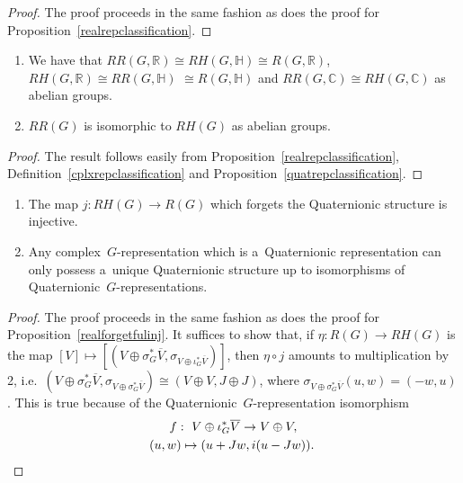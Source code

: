 \begin{proof}
The proof proceeds in the same fashion as does the proof for Proposition~\ref{realrepclassification}.
\end{proof}
\begin{Corollary}\label{3by3table}\quad
\begin{enumerate}\itemsep=0pt
\item[$1.$]
We have that $RR(G, \mathbb{R})\cong RH(G, \mathbb{H})\cong R(G, \mathbb{R})$, $RH(G, \mathbb{R})\cong RR(G,\mathbb{H})$
$\cong R(G, \mathbb{H})$ and $RR(G, \mathbb{C})\cong RH(G, \mathbb{C})$ as abelian groups.
\item[$2.$]
$RR(G)$ is isomorphic to $RH(G)$ as abelian groups.
\end{enumerate}
\end{Corollary}

\begin{proof}
The result follows easily from Proposition~\ref{realrepclassification}, Def\/inition~\ref{cplxrepclassification} and
Proposition~\ref{quatrepclassification}.
\end{proof}
\begin{Proposition}\label{quatforgetfulinj}\quad
\begin{enumerate}\itemsep=0pt
\item[$1.$]
The map $j: RH(G)\to R(G)$ which forgets the Quaternionic structure is injective.
\item[$2.$]
Any complex~$G$-representation which is a~Quaternionic representation can only possess a~unique Quaternionic structure
up to isomorphisms of Quaternionic~$G$-representations.
\end{enumerate}
\end{Proposition}
\begin{proof}
The proof proceeds in the same fashion as does the proof for Proposition~\ref{realforgetfulinj}.
It suf\/f\/ices to show that, if $\eta: R(G)\to RH(G)$ is the map $[V]\mapsto [(V\oplus
\sigma_G^*\overline{V},
\sigma_{V\oplus\iota_G^*\overline{V}})]$, then $\eta\circ j$ amounts to multiplication by 2, i.e.\
$(V\oplus\sigma_G^*\overline{V},\sigma_{V\oplus\sigma_G^*\overline{V}})\cong(V\oplus V, J\oplus J)$, where $\sigma_{V\oplus\sigma_G^*\overline{V}}(u, w)=(-w, u)$.
This is true because of the Quaternionic~$G$-representation isomorphism
\begin{gather*}
f: \  V\oplus\iota_G^*\overline{V}  \to   V\oplus V,\\
\hphantom{f: {}}  \ (u, w) \mapsto  (u+Jw, i(u-Jw)). \tag*{\qed}
\end{gather*}
\renewcommand{\qed}{}
\end{proof}

